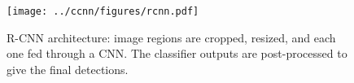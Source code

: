 \begin{figure}[ht]
\begin{center}
\texttt{[image: ../ccnn/figures/rcnn.pdf]}
\caption[
Summary of the R-CNN architecture.]{
R-CNN architecture: image regions are cropped, resized, and each one fed through a CNN.
The classifier outputs are post-processed to give the final detections.
}\label{fig:rcnn}
\end{center}
\end{figure}
